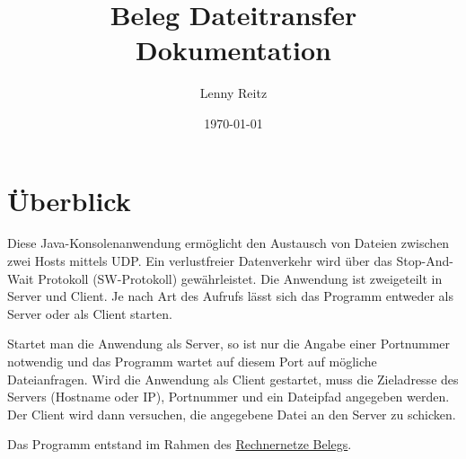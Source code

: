 \documentclass{article}
\title{Beleg Dateitransfer \\ \large Dokumentation}
\date{\today}
\author{Lenny Reitz}
\begin{document}
	\maketitle
	\newpage
	\tableofcontents
	\newpage

	\section{Überblick}
	Diese Java-Konsolenanwendung ermöglicht den Austausch von Dateien zwischen zwei Hosts mittels UDP. Ein verlustfreier Datenverkehr wird über das Stop-And-Wait Protokoll (SW-Protokoll) gewährleistet. Die Anwendung ist zweigeteilt in Server und Client. Je nach Art des Aufrufs lässt sich das Programm entweder als Server oder als Client starten.

	Startet man die Anwendung als Server, so ist nur die Angabe einer Portnummer notwendig und das Programm wartet auf diesem Port auf mögliche Dateianfragen. Wird die Anwendung als Client gestartet, muss die Zieladresse des Servers (Hostname oder IP), Portnummer und ein Dateipfad angegeben werden. Der Client wird dann versuchen, die angegebene Datei an den Server zu schicken.

	Das Programm entstand im Rahmen des \href{https://github.com/HTWDD-RN/Dateitransfer}{Rechnernetze Belegs}.

	\newpage
\end{document}
